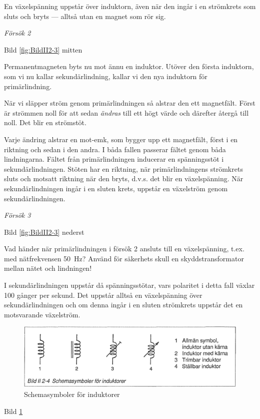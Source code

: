 En växelspänning uppstår över induktorn, även när den ingår i en strömkrets som
sluts och bryts --- alltså utan en magnet som rör sig.

\emph{Försök 2}

Bild \ref{fig:BildII2-3} mitten

Permanentmagneten byts nu mot ännu en induktor. Utöver den första induktorn, som
vi nu kallar sekundärlindning, kallar vi den nya induktorn för primärlindning.

När vi släpper ström genom primärlindningen så alstrar den ett magnetfält. Först
är strömmen noll för att sedan \emph{ändras} till ett högt värde och därefter
återgå till noll. Det blir en strömstöt.

Varje ändring alstrar en mot-emk, som bygger upp ett magnetfält, först i en
riktning och sedan i den andra. I båda fallen passerar fältet genom båda
lindningarna. Fältet från primärlindningen inducerar en spänningsstöt i
sekundärlindningen. Stöten har en riktning, när primärlindningens strömkrets
sluts och motsatt riktning när den bryts, d.v.s. det blir en växelspänning.
När sekundärlindningen ingår i en sluten krets, uppstår en växelström genom
sekundärlindningen.

\emph{Försök 3}


Bild \ref{fig:BildII2-3} nederst

Vad händer när primärlindningen i försök 2 ansluts till en växelspänning, t.ex.
med nätfrekvensen 50~Hz? Använd för säkerhets skull en skyddstransformator
mellan nätet och lindningen!

I sekundärlindningen uppstår då spänningsstötar, vars polaritet i detta fall
växlar 100 gånger per sekund. Det uppstår alltså en växelspänning över
sekundärlindningen och om denna ingår i en sluten strömkrets uppstår det en
motsvarande växelström.


\begin{figure}
\includegraphics[width=\textwidth]{images/bild_2_2-04}
\caption{Schemasymboler för induktorer}
\label{fig:BildII2-4}
\end{figure}

Bild \ref{fig:BildII2-4}

